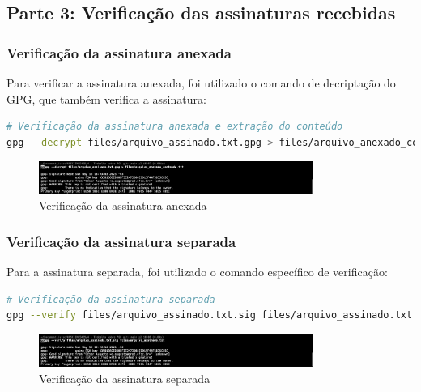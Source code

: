 \subsection{Parte 3: Verificação das assinaturas recebidas}

\subsubsection{Verificação da assinatura anexada}

Para verificar a assinatura anexada, foi utilizado o comando de decriptação do GPG, que também verifica a assinatura:

\begin{lstlisting}[language=bash]
# Verificação da assinatura anexada e extração do conteúdo
gpg --decrypt files/arquivo_assinado.txt.gpg > files/arquivo_anexado_conteudo.txt
\end{lstlisting}

\begin{figure}[htb]
    \centering
    \includegraphics[width=0.8\textwidth]{images/11-verificacao_assinatura_anexada.jpg}
    \caption{Verificação da assinatura anexada}
    \label{fig:verificacao-assinatura-anexada}
\end{figure}

\subsubsection{Verificação da assinatura separada}

Para a assinatura separada, foi utilizado o comando específico de verificação:

\begin{lstlisting}[language=bash]
# Verificação da assinatura separada
gpg --verify files/arquivo_assinado.txt.sig files/arquivo_assinado.txt
\end{lstlisting}

\begin{figure}[htb]
    \centering
    \includegraphics[width=0.8\textwidth]{images/11-verificacao_assinatura_separada.jpg}
    \caption{Verificação da assinatura separada}
    \label{fig:verificacao-assinatura-separada}
\end{figure}

